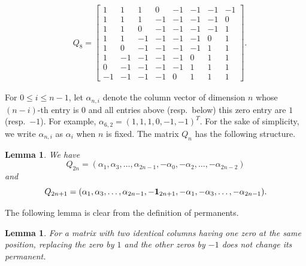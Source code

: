 \documentclass[11pt,reqno]{amsart}
\numberwithin{equation}{section}
\theoremstyle{plain}
\newtheorem{lemma}[theorem]{Lemma}
\theoremstyle{definition}
\begin{document}
\begin{align*}
\quad
Q_8=\begin{bmatrix}
1 & 1 & 1 &0& -1 & -1 & -1& -1\\
1 & 1 & 1 &-1 & -1 & -1 & -1 & 0 \\
1 & 1 & 0& -1 & -1 & -1 &-1 & 1\\
1 &1& -1 & -1 & -1 &-1 & 0 & 1\\
1 & 0&  -1 & -1 & -1 & -1 &1 & 1\\
1 &-1& -1 & -1 & -1  & 0 & 1&1\\
0 & -1& -1 & -1 & -1& 1& 1 & 1\\
 -1 & -1 & -1 & -1 & 0 & 1 & 1 & 1
\end{bmatrix}.
\end{align*}

For $0\leq i\leq n-1$, let $\alpha_{n,i}$ denote the column vector of dimension $n$ whose $(n-i)$-th entry is $0$ and all entries above (resp.~below) this zero entry are $1$ (resp.~$-1$). For example, $\alpha_{6,2}=(1,1,1,0,-1,-1)^T$. For the sake of simplicity,  we write $\alpha_{n,i}$ as $\alpha_i$ when $n$ is fixed.
The matrix $Q_n$ has the following structure.

\begin{lemma}\label{mat:Q}
We have
$$Q_{2n}=(\alpha_{1},\alpha_{3},\ldots,\alpha_{2n-1},-\alpha_0,-\alpha_2,\ldots,-\alpha_{2n-2})$$
and $$Q_{2n+1}=(\alpha_{1},\alpha_{3},\ldots,\alpha_{2n-1},-{\bf1}_{2n+1},-\alpha_1,-\alpha_3,\ldots,-\alpha_{2n-1}).$$
\end{lemma}

The following lemma is clear from the definition of permanents.
\begin{lemma}\label{obs:rep}
For a matrix with two identical columns having one zero at the same position, replacing the zero by $1$ and the other zeros by $-1$ does not change its permanent.
\end{lemma}
\end{document}
